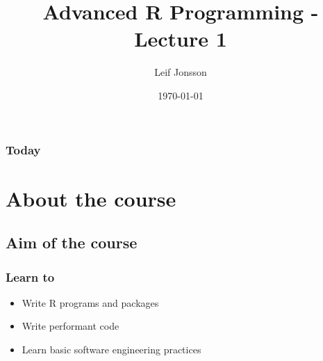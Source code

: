 \documentclass{beamer}
\title[Lecture 1]{Advanced R Programming - Lecture 1} %
\author{Leif Jonsson} %
\institute[STIMA LiU] %
{
Link\"{o}ping University \\ %
\medskip
\textit{leif.jonsson@ericsson.com\\leif.r.jonsson@liu.se} %
}
\date{\today} %
\begin{document}
\begin{frame}
\titlepage %
\end{frame}

\begin{frame}
\frametitle{Today} %
\tableofcontents %
\end{frame}


\section{About the course} %

\subsection{Aim of the course} %

\begin{frame}
\frametitle{Learn to}
\begin{itemize}
\item Write R programs and packages
\item Write performant code
\item Learn basic software engineering practices
\end{itemize}
\end{frame}
\end{document}
